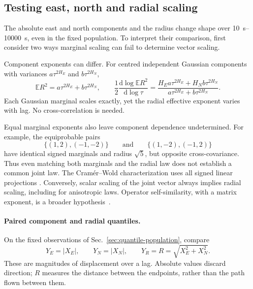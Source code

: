 \subsection{Testing east, north and radial scaling}
\label{sec:component-self-similarity}

The absolute east and north components and the radius change shape over
\SIrange{10}{10000}{\second}, even in the fixed population. To interpret their
comparison, first consider two ways marginal scaling can fail to determine vector
scaling.

Component exponents can differ. For centred independent Gaussian components with
variances $a\tau^{2H_E}$ and $b\tau^{2H_N}$,
\begin{equation}
  \mathbb E R^2=a\tau^{2H_E}+b\tau^{2H_N},\qquad
  \frac12\frac{\mathrm d\log\mathbb E R^2}{\mathrm d\log\tau}
   =\frac{H_Ea\tau^{2H_E}+H_Nb\tau^{2H_N}}
          {a\tau^{2H_E}+b\tau^{2H_N}}.
  \label{eq:anisotropic-exponents}
\end{equation}
Each Gaussian marginal scales exactly, yet the radial effective exponent varies
with lag. No cross-correlation is needed.

Equal marginal exponents also leave component dependence undetermined. For example,
the equiprobable pairs
\begin{equation}
 \{(1,2),(-1,-2)\}\qquad\text{and}\qquad
 \{(1,-2),(-1,2)\}
 \label{eq:joint-law-counterexample}
\end{equation}
have identical signed marginals and radius $\sqrt5$, but opposite cross-covariance.
Thus even matching both marginals and the radial law does not establish a common
joint law. The Cram\'er--Wold characterization uses all signed linear projections
\cite{fraiman2022}. Conversely, scalar scaling of the joint vector always implies
radial scaling, including for anisotropic laws. Operator self-similarity, with a
matrix exponent, is a broader hypothesis~\cite{didier2011}.

\paragraph{Paired component and radial quantiles.}
On the fixed observations of Sec.~\ref{sec:quantile-population}, compare
\begin{equation}
 Y_E=|X_E|,\qquad Y_N=|X_N|,\qquad
 Y_R=R=\sqrt{X_E^2+X_N^2}.
 \label{eq:positive-displacements}
\end{equation}
These are magnitudes of displacement over a lag. Absolute values discard direction;
$R$ measures the distance between the endpoints, rather than the path flown between
them.

